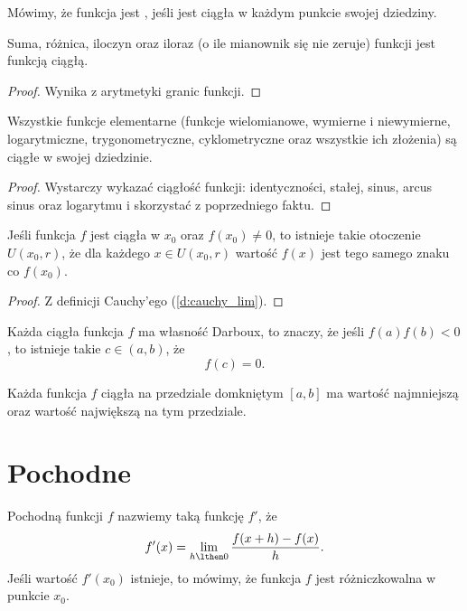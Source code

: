 \documentclass[11pt]{scrartcl}
\begin{document}
    Mówimy, że funkcja jest , jeśli jest ciągła w każdym punkcie swojej dziedziny.

    \begin{fact}
        Suma, różnica, iloczyn oraz iloraz (o ile mianownik się nie zeruje) funkcji jest funkcją ciągłą.
    \end{fact}
    \begin{proof}
        Wynika z arytmetyki granic funkcji.
    \end{proof}

    \begin{fact}
        Wszystkie funkcje elementarne (funkcje wielomianowe, wymierne i niewymierne, logarytmiczne, trygonometryczne, cyklometryczne oraz wszystkie ich złożenia) są ciągłe w swojej dziedzinie.
    \end{fact}
    \begin{proof}
        Wystarczy wykazać ciągłość funkcji: identyczności, stałej, sinus, arcus sinus oraz logarytmu i skorzystać z poprzedniego faktu.
    \end{proof}

    \begin{theorem}
        Jeśli funkcja $f$ jest ciągła w $x_0$ oraz $f(x_0) \neq 0$, to istnieje takie otoczenie $U(x_0, r)$, że dla każdego $x \in U(x_0, r)$ wartość $f(x)$ jest tego samego znaku co $f(x_0)$.
    \end{theorem}
    \begin{proof}
        Z definicji Cauchy'ego (\ref{d:cauchy_lim}).
    \end{proof}

    \begin{theorem}
        Każda ciągła funkcja $f$ ma własność Darboux, to znaczy, że jeśli $f(a)f(b) < 0$, to istnieje takie $c \in (a, b)$, że
        \[ f(c) = 0. \]
    \end{theorem}

    \begin{theorem}
        \label{t:Weierstrass}
        Każda funkcja $f$ ciągła na przedziale domkniętym $[a, b]$ ma wartość najmniejszą oraz wartość największą na tym przedziale.
    \end{theorem}

    \section{Pochodne}
    \begin{definition}
        Pochodną funkcji $f$ nazwiemy taką funkcję $f'$, że
        \[ f'(x) = \lim_{h\lthen 0}\frac{f(x + h) - f(x)}{h}. \]
        Jeśli wartość $f'(x_0)$ istnieje, to mówimy, że funkcja $f$ jest różniczkowalna w punkcie $x_0$.
    \end{definition}
\end{document}

